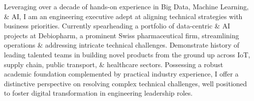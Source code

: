 

\begin{cvparagraph}

Leveraging over a decade of hands-on experience in Big Data, Machine Learning, \& AI, I am an engineering executive adept at aligning technical strategies with business priorities. 
Currently spearheading a portfolio of data-centric \& AI projects at Debiopharm, a prominent Swiss pharmaceutical firm, streamlining operations \& addressing intricate technical challenges. 
Demonstrate history of leading talented teams in building novel products from the ground up across IoT, supply chain, public transport, \& healthcare sectors.
Possessing a robust academic foundation complemented by practical industry experience, I offer a distinctive perspective on resolving complex technical challenges, well positioned to foster digital transformation in engineering leadership roles.
\end{cvparagraph}
